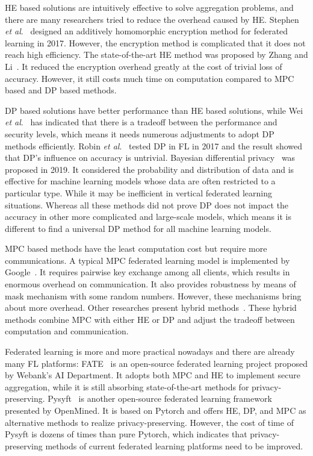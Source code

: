 HE based solutions are intuitively effective to solve aggregation problems, and there are many researchers tried to reduce the overhead caused by HE. Stephen \emph{et al}.~\cite{abs-1711-10677} designed an additively homomorphic encryption method for federated learning in 2017. However, the encryption method is complicated that it does not reach high efficiency. The state-of-the-art HE method was proposed by Zhang and Li~\cite{BatchCrypt}. It reduced the encryption overhead greatly at the cost of trivial loss of accuracy. However, it still costs much time on computation compared to MPC based and DP based methods.

DP based solutions have better performance than HE based solutions, while Wei \emph{et al}.~\cite{DPAnalysis} has indicated that there is a tradeoff between the performance and security levels, which means it needs numerous adjustments to adopt DP methods efficiently. Robin \emph{et al}.~\cite{geyer2017differentially} tested DP in FL in 2017 and the result showed that DP's influence on accuracy is untrivial. Bayesian differential privacy~\cite{Bayesian} was proposed in 2019. It considered the probability and distribution of data and is effective for machine learning models whose data are often restricted to a particular type. While it may be inefficient in vertical federated learning situations. Whereas all these methods did not prove DP does not impact the accuracy in other more complicated and large-scale models, which means it is different to find a universal DP method for all machine learning models.

MPC based methods have the least computation cost but require more communications. A typical MPC federated learning model is implemented by Google~\cite{Practical}. It requires pairwise key exchange among all clients, which results in enormous overhead on communication. It also provides robustness by means of mask mechanism with some random numbers. However, these mechanisms bring about more overhead. Other researches present hybrid methods~\cite{Hybrid,HybridAlpha}. These hybrid methods combine MPC with either HE or DP and adjust the tradeoff between computation and communication.

Federated learning is more and more practical nowadays and there are already many FL platforms: FATE~\cite{fate} is an open-source federated learning project proposed by Webank’s AI Department. It adopts both MPC and HE to implement secure aggregation, while it is still absorbing state-of-the-art methods for privacy-preserving. Pysyft~\cite{pysyft} is another open-source federated learning framework presented by OpenMined. It is based on Pytorch and offers HE, DP, and MPC as alternative methods to realize privacy-preserving. However, the cost of time of Pysyft is dozens of times than pure Pytorch, which indicates that privacy-preserving methods of current federated learning platforms need to be improved.
